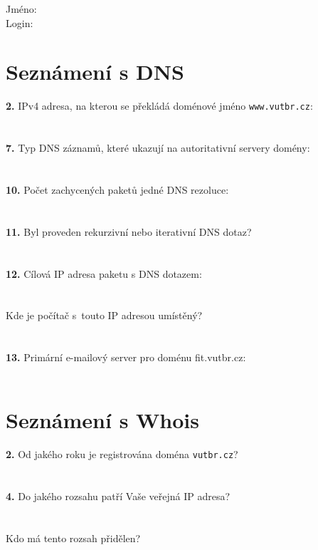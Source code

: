 Jméno:\\
Login:\\

\section{Seznámení s DNS}
\textbf{2.} IPv4 adresa, na kterou se překládá doménové jméno {\tt www.vutbr.cz}:\\
\\
\\
\textbf{7.} Typ DNS záznamů, které ukazují na autoritativní servery domény:\\
\\
\\
\textbf{10.} Počet zachycených paketů jedné DNS rezoluce: \\
\\
\\
\textbf{11.} Byl proveden rekurzivní nebo iterativní DNS dotaz?\\
\\
\\
\textbf{12.} Cílová IP adresa paketu s DNS dotazem:\\
\\
\\
Kde je počítač s~touto IP adresou umístěný?\\
\\
\\
\textbf{13.} Primární e-mailový server pro doménu fit.vutbr.cz:\\
\\


\section{Seznámení s Whois}
\textbf{2.} Od jakého roku je registrována doména {\tt vutbr.cz}?\\
\\
\\
\textbf{4.} Do jakého rozsahu patří Vaše veřejná IP adresa?\\
\\
\\
Kdo má tento rozsah přidělen?\\
\\
\\
\\
\\
\\
\\
\\
\\

